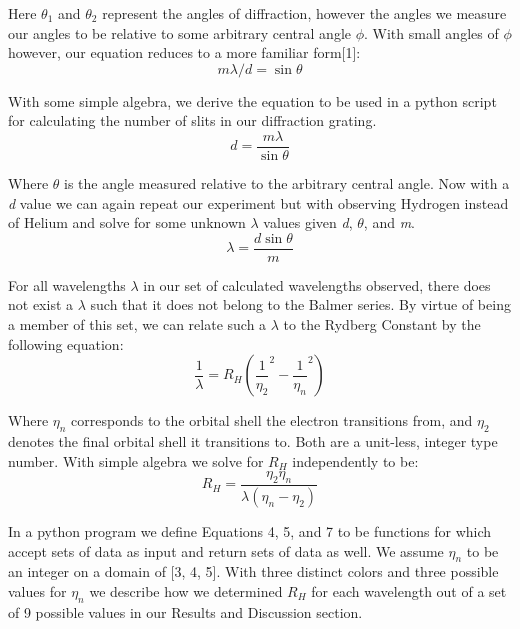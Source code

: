 \documentclass{article}
\begin{document}
Here $\theta_1$ and $\theta_2$ represent the angles of diffraction, however the angles we measure our angles to be relative to some arbitrary central angle $\phi$. With small angles of $\phi$ however, our equation reduces to a more familiar form[1]:
\begin{equation}m\lambda/d = \sin\theta\end{equation}


With some simple algebra, we derive the equation to be used in a python script for calculating the number of slits in our diffraction grating.
\begin{equation}d = \frac{m\lambda}{\sin\theta}\end{equation}


Where $\theta$ is the angle measured relative to the arbitrary central angle.
Now with a \textit{d} value we can again repeat our experiment but with observing Hydrogen instead of Helium and solve for some unknown $\lambda$ values given \textit{d}, \textit{$\theta$}, and \textit{m}.
\begin{equation} \lambda = \frac{d\sin\theta}{m}\end{equation}


For all wavelengths \textit{$\lambda$} in our set of calculated wavelengths observed, there does not exist a \textit{$\lambda$} such that it does not belong to the Balmer series. By virtue of being a member of this set, we can relate such a \textit{$\lambda$} to the Rydberg Constant by the following equation: 
\begin{equation}\frac{1}{\lambda} = R_H(\frac{1}{\eta_2}^2 - \frac{1}{\eta_n}^2) \end{equation}


Where $\eta_n$ corresponds to the orbital shell the electron transitions from, and $\eta_2$ denotes the final orbital shell it transitions to. Both are a unit-less, integer type number. With simple algebra we solve for $R_H$ independently to be:
\begin{equation}R_H = \frac{\eta_2\eta_n}{\lambda(\eta_n-\eta_2)} \end{equation}


In a python program we define Equations 4, 5, and 7 to be functions for which accept sets of data as input and return sets of data as well. We assume $\eta_n$ to be an integer on a domain of [3, 4, 5]. With three distinct colors and three possible values for $\eta_n$ we describe how we determined $R_H$ for each wavelength out of a set of 9 possible values in our Results and Discussion section.
\end{document}
